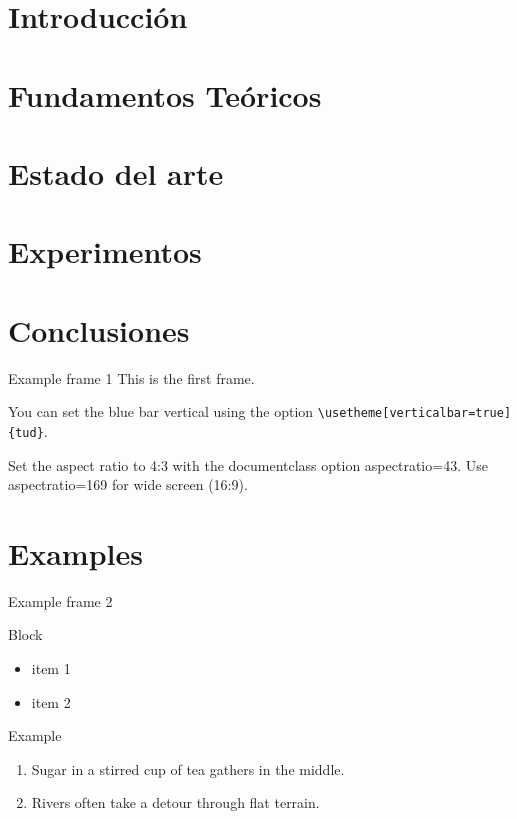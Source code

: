 \documentclass[aspectratio=43]{beamer}
\renewcommand{\cite}[1]{\footnote<.->[frame]{\fullcite{#1}}}
\begin{document}
\section{Introducción}

\section{Fundamentos Teóricos}

\section{Estado del arte}

\section{Experimentos}

\section{Conclusiones}


\begin{frame}[fragile]{Example frame 1} %
This is the first frame.

You can set the blue bar vertical using the option \verb|\usetheme[verticalbar=true]{tud}|.

Set the aspect ratio to 4:3 with the
documentclass option aspectratio=43. Use aspectratio=169 for wide screen (16:9).
\end{frame}

\section{Examples}
\begin{frame}{Example frame 2}
  \begin{block}{Block}
    \begin{itemize}
      \item item 1
      \item item 2
    \end{itemize}
  \end{block}

  \begin{exampleblock}{Example}
    \begin{enumerate}
      \item Sugar in a stirred cup of tea gathers in the middle.
      \item Rivers often take a detour through flat terrain.
    \end{enumerate}
  \end{exampleblock}

\end{frame}
\end{document}
